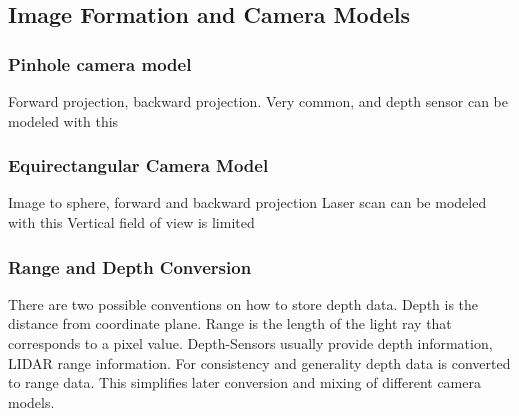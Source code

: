 \subsection{Image Formation and Camera Models}

\subsubsection{Pinhole camera model}

Forward projection, backward projection.
Very common, and depth sensor can be modeled with this

\subsubsection{Equirectangular Camera Model}

Image to sphere, forward and backward projection
Laser scan can be modeled with this
Vertical field of view is limited

\subsubsection{Range and Depth Conversion}

There are two possible conventions on how to store depth data.
Depth is the distance from coordinate plane.
Range is the length of the light ray that corresponds to a pixel value.
Depth-Sensors usually provide depth information, LIDAR range information.
For consistency and generality depth data is converted to range data.
This simplifies later conversion and mixing of different camera models.

